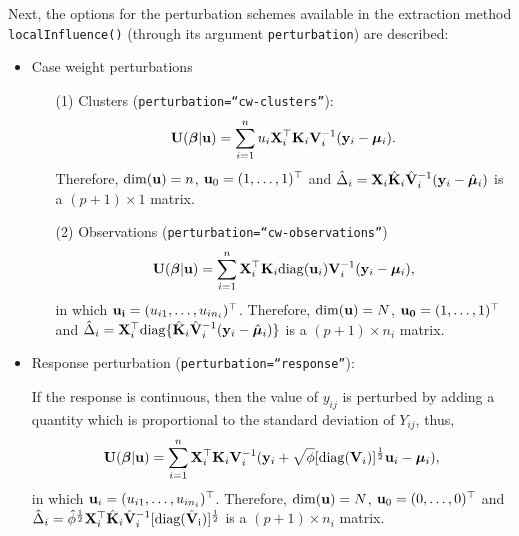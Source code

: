 Next, the options for the perturbation schemes available in the extraction method {\tt localInfluence()} (through its argument {\tt perturbation}) are described:
\begin{itemize}
    \item Case weight perturbations
    \begin{itemize}
        \item[(1)] Clusters ({\tt perturbation=``cw-clusters''}):
        \begin{equation*}
         {\bf U}(\bm{\beta}|{\bf u})=\sum\limits_{i=1}^{n} u_i{\bf X}_i^{\top}{\bf K}_i{\bf V}_i^{-1} ({\bf y}_i - \bm{\mu}_i)  .
        \end{equation*} 
        Therefore, ${\rm dim}({\bf u})=n$, ${\bf u}_0=(1,\ldots,1)^{\top}$ and $\hat{\Delta}_i={\bf X}_i\hat{\bf K}_i\hat{\bf V}_i^{-1}({\bf y}_i - \hat{\bm{\mu}}_i)$ is a $(p+1)\times 1$ matrix.
        \item[(2)] Observations ({\tt perturbation=``cw-observations''})
        \begin{equation*}
         {\bf U}(\bm{\beta}|{\bf u})=\sum\limits_{i=1}^{n} {\bf X}_i^{\top}{\bf K}_i{\rm diag}({\bf u}_i){\bf V}_i^{-1} ({\bf y}_i - \bm{\mu}_i),
        \end{equation*} 
        in which ${\bf u_i}=(u_{i1},\ldots,u_{in_{i}})^{\top}$. Therefore, ${\rm dim}({\bf u})=N$, ${\bf u_0}=(1,\ldots,1)^{\top}$ and $\hat{\Delta}_i={\bf X}_i^{\top}{\rm diag}\{\hat{\bf K}_i \hat{\bf V}_i^{-1}  ({\bf y}_i -\hat{\bm{\mu}}_i) \}$ is a $(p+1)\times n_i$ matrix.
        \end{itemize}
    \item Response perturbation ({\tt perturbation=``response''}):

    If the response is continuous, then the value of $y_{ij}$ is perturbed by adding a quantity which is proportional to the standard deviation of $Y_{ij}$, thus,
    \begin{equation*}
         {\bf U}(\bm{\beta}|{\bf u})=\sum\limits_{i=1}^{n} {\bf X}_i^{\top}{\bf K}_i{\bf V}_i^{-1} ({\bf y}_i + \sqrt{\phi}[{\rm diag} ({\bf V}_i)]^{\frac{1}{2}} {\bf u}_i - \bm{\mu}_i),
        \end{equation*} 
     in which ${\bf u}_i= (u_{i1},\ldots,u_{in_i})^{\top}$. Therefore, ${\rm dim}({\bf u})=N$, ${\bf u}_0=(0,\ldots,0)^{\top}$ and $\hat{\Delta}_i=\hat{\phi}^{\frac{1}{2}}{\bf X}_i^{\top}\hat{\bf K}_i\hat{\bf V}_i ^{-1}[{\rm diag(\hat{\bf V}_i})]^{\frac{1}{2}}$ is a $(p+1)\times n_i$ matrix.   


\end{itemize}
